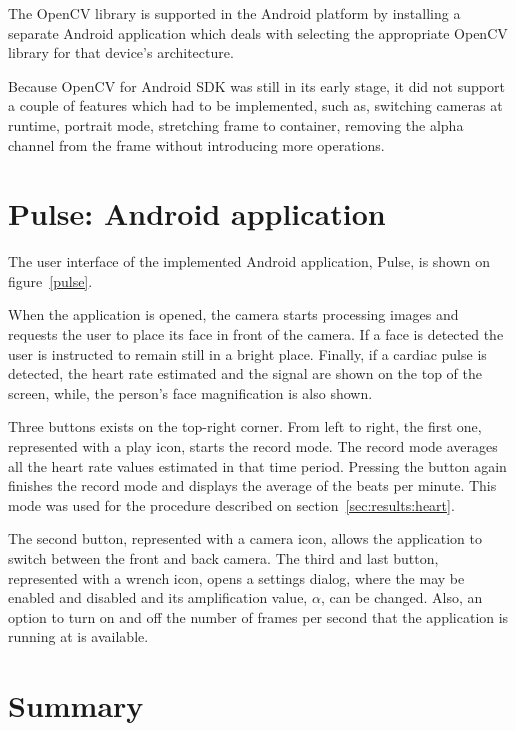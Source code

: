 The OpenCV library is supported in the Android platform by installing
a separate Android application which deals with selecting the appropriate
OpenCV library for that device's architecture.

Because OpenCV for Android SDK was still in its early stage, it did not support
a couple of features which had to be implemented, such as, switching cameras at
runtime, portrait mode, stretching frame to container, removing the alpha
channel from the frame without introducing more operations.

\section{Pulse: Android application} \label{sec:impl:app}


The user interface of the implemented Android application, Pulse, is shown on
figure~\ref{pulse}.

When the application is opened, the camera starts processing images and
requests the user to place its face in front of the camera. If a face is
detected the user is instructed to remain still in a bright place. Finally,
if a cardiac pulse is detected, the heart rate estimated and the signal
are shown on the top of the screen, while, the person's face magnification
is also shown.

Three buttons exists on the top-right corner. From left to right, the first
one, represented with a play icon, starts the record mode. The record mode
averages all the heart rate values estimated in that time period. Pressing the
button again finishes the record mode and displays the average of the
beats per minute. This mode was used for the procedure described on
section~\ref{sec:results:heart}.

The second button, represented with a camera icon, allows the application
to switch between the front and back camera. The third and last button,
represented with a wrench icon, opens a settings dialog, where the
\evm{} may be enabled and disabled and its amplification value, $\alpha$,
can be changed. Also, an option to turn on and off the number of
frames per second that the application is running at is available.

\section{Summary}

